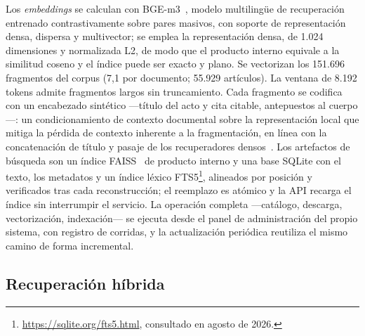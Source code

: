 \documentclass{llncs}
\begin{document}
Los \emph{embeddings} se calculan con BGE-m3~\cite{chen2024bge}, modelo
multilingüe de recuperación entrenado contrastivamente sobre pares masivos,
con soporte de representación densa, dispersa y multivector; se emplea la
representación densa, de 1.024 dimensiones y normalizada L2, de modo que el
producto interno equivale a la similitud coseno y el índice puede ser exacto y
plano. Se vectorizan los 151.696 fragmentos del corpus (7,1 por documento;
55.929 artículos). La ventana de 8.192
tokens admite fragmentos largos sin truncamiento. Cada fragmento se codifica con
un encabezado sintético ---título del acto y cita citable, antepuestos al
cuerpo---: un condicionamiento de contexto documental sobre la representación
local que mitiga la pérdida de contexto inherente a la fragmentación,
en línea con la concatenación de título y pasaje de los recuperadores
densos~\cite{karpukhin2020dpr}. Los artefactos de búsqueda son un
índice FAISS~\cite{douze2024faiss} de producto interno y una base SQLite con el
texto, los metadatos y un índice léxico FTS5\footnote{\url{https://sqlite.org/fts5.html}, consultado en agosto de 2026.},
alineados por posición y verificados tras cada reconstrucción; el reemplazo es atómico y la API recarga el índice sin
interrumpir el servicio. La operación completa ---catálogo, descarga,
vectorización, indexación--- se ejecuta desde el panel de administración del
propio sistema, con registro de corridas, y la actualización periódica
reutiliza el mismo camino de forma incremental.

\subsection{Recuperación híbrida}
\label{sec:sistema}
\end{document}
